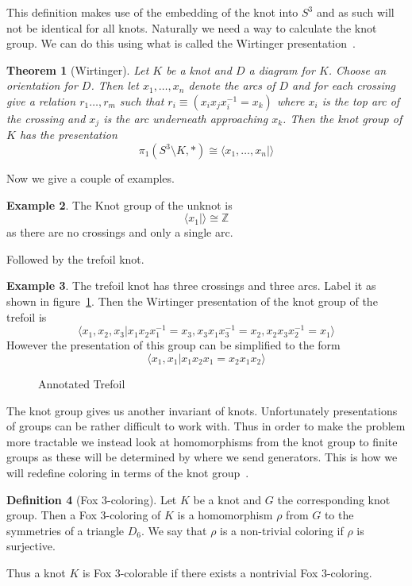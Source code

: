 \documentclass[12pt]{amsart}
\newtheorem{theorem}{Theorem}[section]
\theoremstyle{definition}
\newtheorem{definition}[theorem]{Definition}
\newtheorem{example}[theorem]{Example}
\theoremstyle{remark}
\numberwithin{equation}{section}
\newcommand{\bb}[1]{\mathbb{#1}}
\begin{document}
This definition makes use of the embedding of the knot into $S^3$ and
as such will not be identical for all knots. Naturally we need a way
to calculate the knot group. We can do this using what is called
the Wirtinger presentation~\cite{hatcher}.

\begin{theorem}[Wirtinger]
  Let $K$ be a knot and $D$ a diagram for $K$. Choose an
  orientation for $D$. Then let $x_1,\ldots,x_n$
  denote the arcs of $D$ and for each crossing give a relation
  $r_1\ldots, r_m$ such that $r_i \equiv (x_ix_jx_i^{-1}=x_k)$ where $x_i$ is
  the top arc of the crossing and $x_j$ is the arc underneath approaching
  $x_k$. Then the knot group of $K$ has the presentation
  \[
    \pi_1(S^3\setminus K,*)\cong \langle x_1,\ldots, x_n| \rangle
  \]
\end{theorem}

Now we give a couple of examples.

\begin{example}
  The Knot group of the unknot is
  \[
    \langle x_1 |\rangle \cong \bb{Z}
  \]
  as there are no crossings and only a single arc.
\end{example}

Followed by the trefoil knot.

\begin{example}
  The trefoil knot has three crossings and three arcs. Label it as
  shown in figure~\ref{fig:AnnTref}. Then the Wirtinger presentation
  of the knot group of the trefoil is
  \[
    \langle x_1,x_2,x_3|x_1x_2x_1^{-1}=x_3,x_3x_1x_3^{-1}=x_2,x_2x_3x_2^{-1}=x_1\rangle
  \]
  However the presentation of this group can be simplified to the
  form
  \[
    \langle x_1,x_1| x_1x_2x_1=x_2x_1x_2\rangle
  \]
\end{example}

\begin{figure}
  \caption{Annotated Trefoil}
  \label{fig:AnnTref}
\end{figure}

The knot group gives us another invariant of knots. Unfortunately
presentations of groups can be rather difficult to work with.
Thus in order to make the problem more tractable we instead look
at homomorphisms from the knot group to finite groups as these
will be determined by where we send generators. This is
how we will redefine coloring in terms of the knot group~\cite{quickfox}.

\begin{definition}[Fox 3-coloring]
  Let $K$ be a knot and $G$ the corresponding knot group. Then a
  Fox 3-coloring of $K$ is a homomorphism $\rho$ from
  $G$ to the symmetries of a triangle $D_6$. We say that
  $\rho$ is a non-trivial coloring if $\rho$ is surjective.

  Thus a knot $K$ is Fox 3-colorable if there exists a nontrivial
  Fox 3-coloring.
\end{definition}
\end{document}
